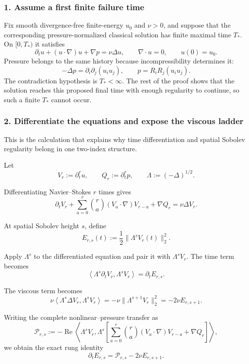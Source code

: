 \documentclass[11pt]{article}
\theoremstyle{definition}
\theoremstyle{remark}
\begin{document}
\setlength{\parindent}{0pt}
\setlength{\parskip}{0.7\baselineskip}
\setlength{\abovedisplayskip}{11pt plus 2pt minus 3pt}
\setlength{\belowdisplayskip}{11pt plus 2pt minus 3pt}
\setlength{\jot}{5pt}

\subsubsection*{1. Assume a first finite failure time}

Fix smooth divergence-free finite-energy \(u_0\) and \(\nu>0\), and suppose
that the corresponding pressure-normalized classical solution has finite
maximal time \(T_*\).  On \([0,T_*)\) it satisfies
\[
\partial_tu+(u\cdot\nabla)u+\nabla p
=
\nu\Delta u,
\qquad
\nabla\cdot u=0,
\qquad
u(0)=u_0.
\]
Pressure belongs to the same history because incompressibility determines it:
\[
-\Delta p=\partial_i\partial_j(u_i u_j),
\qquad
p=R_iR_j(u_i u_j).
\]
The contradiction hypothesis is \(T_*<\infty\).  The rest of the proof shows
that the solution reaches this proposed final time with enough regularity to
continue, so such a finite \(T_*\) cannot occur.

\clearpage
\subsubsection*{2. Differentiate the equations and expose the viscous ladder}

This is the calculation that explains why time differentiation and spatial
Sobolev regularity belong in one two-index structure.

Let
\[
V_r:=\partial_t^r u,
\qquad
Q_r:=\partial_t^r p,
\qquad
\Lambda:=(-\Delta)^{1/2}.
\]

Differentiating Navier--Stokes \(r\) times gives
\[
\partial_tV_r
+
\sum_{a=0}^{r}\binom ra(V_a\!\cdot\nabla)V_{r-a}
+\nabla Q_r
=
\nu\Delta V_r.
\]

At spatial Sobolev height \(s\), define
\[
E_{r,s}(t):=\frac12\|\Lambda^sV_r(t)\|_2^2.
\]

Apply \(\Lambda^s\) to the differentiated equation and pair it with
\(\Lambda^sV_r\).  The time term becomes
\[
\left\langle\Lambda^s\partial_tV_r,\Lambda^sV_r\right\rangle
=
\partial_tE_{r,s}.
\]

The viscous term becomes
\[
\nu\left\langle\Lambda^s\Delta V_r,\Lambda^sV_r\right\rangle
=
-\nu\|\Lambda^{s+1}V_r\|_2^2
=
-2\nu E_{r,s+1}.
\]

Writing the complete nonlinear--pressure transfer as
\[
\mathcal P_{r,s}
:=
-\operatorname{Re}
\left\langle
\Lambda^sV_r,
\Lambda^s\!\left[
\sum_{a=0}^{r}\binom ra(V_a\!\cdot\nabla)V_{r-a}
+\nabla Q_r
\right]
\right\rangle,
\]
we obtain the exact rung identity
\[
\boxed{
\partial_tE_{r,s}
=
\mathcal P_{r,s}-2\nu E_{r,s+1}.
}
\]
\end{document}
